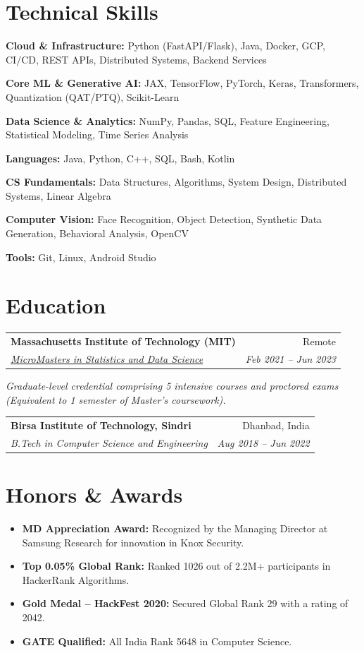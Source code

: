\documentclass[10pt, letterpaper]{article}
\makeatletter
\newcommand{\resumeItem}[1]{
  \item\small{
    {#1 \vspace{-2pt}}
  }
}
\newcommand{\resumeSubheading}[4]{
  \vspace{-1pt}\item
    \begin{tabular*}{0.98\textwidth}[t]{l@{\extracolsep{\fill}}r}
      \textbf{#1} & {\small\color{darkgray} #2} \\
      \textit{\small#3} & \textit{\small\color{darkgray} #4} \\
    \end{tabular*}\vspace{-7pt}
}
\newcommand{\resumeSubHeadingListStart}{\begin{itemize}[leftmargin=0.15in, label={}]}
\newcommand{\resumeSubHeadingListEnd}{\end{itemize}}
\makeatother
\begin{document}
\section{Technical Skills}
 \begin{itemize}[leftmargin=0.12in, label={}]
    \small{\item{\textbf{Cloud \& Infrastructure:} Python (FastAPI/Flask), Java, Docker, GCP, CI/CD, REST APIs, Distributed Systems, Backend Services}}
    \small{\item{\textbf{Core ML \& Generative AI:} JAX, TensorFlow, PyTorch, Keras, Transformers, Quantization (QAT/PTQ), Scikit-Learn}}
    \small{\item{\textbf{Data Science \& Analytics:} NumPy, Pandas, SQL, Feature Engineering, Statistical Modeling, Time Series Analysis}}
    \small{\item{\textbf{Languages:} Java, Python, C++, SQL, Bash, Kotlin}}
    \small{\item{\textbf{CS Fundamentals:} Data Structures, Algorithms, System Design, Distributed Systems, Linear Algebra}}
    \small{\item{\textbf{Computer Vision:} Face Recognition, Object Detection, Synthetic Data Generation, Behavioral Analysis, OpenCV}}
    \small{\item{\textbf{Tools:} Git, Linux, Android Studio}}
 \end{itemize}

\section{Education}
  \resumeSubHeadingListStart
    \resumeSubheading
      {Massachusetts Institute of Technology (MIT)}{Remote}
      {\href{https://micromasters.mit.edu/ds}{MicroMasters in Statistics and Data Science}}{Feb 2021 -- Jun 2023}
      \vspace{-4pt}
      \small{\item{\textit{Graduate-level credential comprising 5 intensive courses and proctored exams (Equivalent to 1 semester of Master's coursework).}}}
    \resumeSubheading
      {Birsa Institute of Technology, Sindri}{Dhanbad, India}
      {B.Tech in Computer Science and Engineering}{Aug 2018 -- Jun 2022}
  \resumeSubHeadingListEnd

\section{Honors \& Awards}
  \resumeSubHeadingListStart
    \resumeItem{\textbf{MD Appreciation Award:} Recognized by the Managing Director at Samsung Research for innovation in Knox Security.}
    \resumeItem{\textbf{Top 0.05\% Global Rank:} Ranked 1026 out of 2.2M+ participants in HackerRank Algorithms.}
    \resumeItem{\textbf{Gold Medal -- HackFest 2020:} Secured Global Rank 29 with a rating of 2042.}
    \resumeItem{\textbf{GATE Qualified:} All India Rank 5648 in Computer Science.}
  \resumeSubHeadingListEnd
\end{document}
